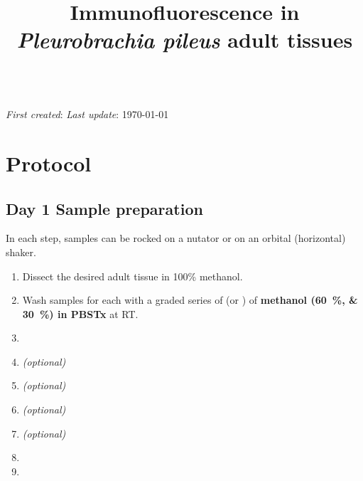 \documentclass[10pt]{report}
\makeatletter
\renewcommand\maketitle{
{\begin{center}
{\Large \bfseries \@title }\\
{\small \emph{First created}: \DTMdisplaydate{2025}{05}{19}{-1}\hfill%
\setstretch{1.0} \small \hfill \emph{Last update}: \today}
\end{center}}} %
\makeatother
\begin{document}

\title{\vspace{-3em} Immunofluorescence in \emph{Pleurobrachia pileus} adult tissues}
\maketitle
\thispagestyle{plain}

\section*{\vspace{-1em} \textendash{} Protocol \textendash{}}

\subsection*{Day 1 \textendash{} Sample preparation}

\alert{In each step, samples can be rocked on a nutator or on an orbital (horizontal) shaker.}

\begin{enumerate}[series = steps]
	\item Dissect the desired adult tissue in 100\% methanol.
	\item Wash samples for \underline{\quarter} each with a graded series of \fivehunmicrol{} (or \onemil) of \textbf{methanol (\qtylist{60;30}{\percent}) in PBSTx} at RT.
	\item {}
	\item \textit{(optional)} 
	\item \textit{(optional)} 
	\item \textit{(optional)} 
	\item \textit{(optional)} 
	\item {}
	\item {}
\end{enumerate}
\end{document}
